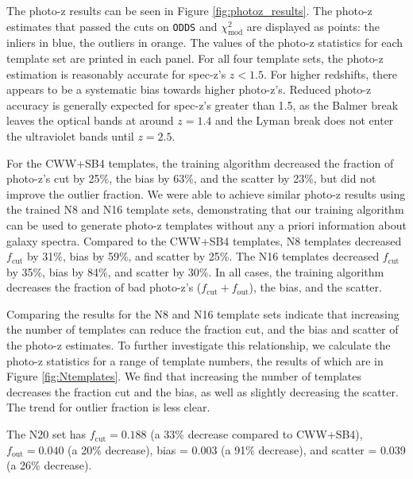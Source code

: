 \documentclass[twocolumn]{aastex63}
\begin{document}
    The photo-z results can be seen in Figure \ref{fig:photoz_results}.
    The photo-z estimates that passed the cuts on \texttt{ODDS} and $\chi_\text{mod}^2$ are displayed as points: the inliers in blue, the outliers in orange.
    The values of the photo-z statistics for each template set are printed in each panel.
    For all four template sets, the photo-z estimation is reasonably accurate for spec-z's $z < 1.5$.
    For higher redshifts, there appears to be a systematic bias towards higher photo-z's.
    Reduced photo-z accuracy is generally expected for spec-z's greater than 1.5, as the Balmer break leaves the optical bands at around $z=1.4$ and the Lyman break does not enter the ultraviolet bands until $z=2.5$.

    For the CWW+SB4 templates, the training algorithm decreased the fraction of photo-z's cut by 25\%, the bias by 63\%, and the scatter by 23\%, but did not improve the outlier fraction.
    We were able to achieve similar photo-z results using the trained N8 and N16 template sets, demonstrating that our training algorithm can be used to generate photo-z templates without any a priori information about galaxy spectra.
    Compared to the CWW+SB4 templates, N8 templates decreased $f_\text{cut}$ by 31\%, bias by 59\%, and scatter by 25\%.
    The N16 templates decreased $f_\text{cut}$ by 35\%, bias by 84\%, and scatter by 30\%.
    In all cases, the training algorithm decreases the fraction of bad photo-z's ($f_\text{cut} + f_\text{out}$), the bias, and the scatter.

    Comparing the results for the N8 and N16 template sets indicate that increasing the number of templates can reduce the fraction cut, and the bias and scatter of the photo-z estimates.
    To further investigate this relationship, we calculate the photo-z statistics for a range of template numbers, the results of which are in Figure \ref{fig:Ntemplates}.
    We find that increasing the number of templates decreases the fraction cut and the bias, as well as slightly decreasing the scatter.
    The trend for outlier fraction is less clear.

    The N20 set has $f_\text{cut} = 0.188$ (a 33\% decrease compared to CWW+SB4), $f_\text{out} = 0.040$ (a 20\% decrease), bias = 0.003 (a 91\% decrease), and scatter = 0.039 (a 26\% decrease).
\end{document}
